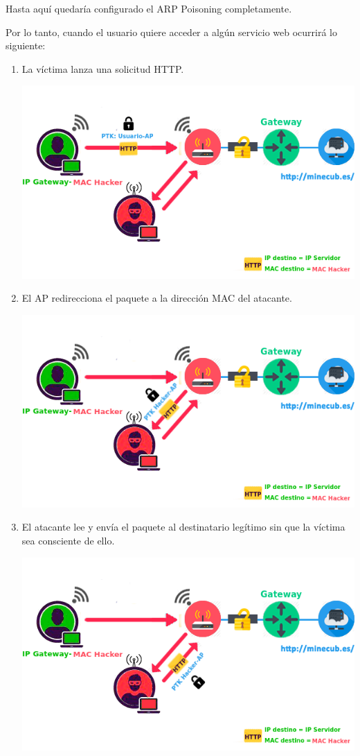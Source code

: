 Hasta aquí quedaría configurado el ARP Poisoning completamente.

Por lo tanto, cuando el usuario quiere acceder a algún servicio web ocurrirá lo siguiente:
\newpage
\begin{enumerate}
	\item La víctima lanza una solicitud HTTP.
	\begin{center}
		\includegraphics[scale=0.7]{ARPpoison3.png}
	\end{center}
	\item El AP redirecciona el paquete a la dirección MAC del atacante.
	\begin{center}
		\includegraphics[scale=0.7]{ARPpoison3-2.png}
	\end{center}
\newpage
	\item El atacante lee y envía el paquete al destinatario legítimo sin que la víctima sea consciente de ello.
	\begin{center}
		\includegraphics[scale=0.7]{ARPpoison3-3.png}
	\end{center}
\end{enumerate}

